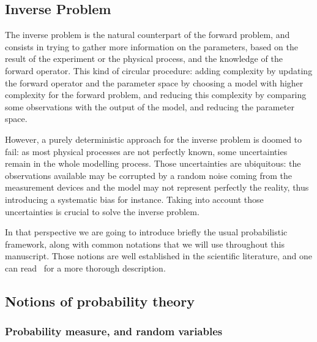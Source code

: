 \documentclass[a4paper,11pt]{article}
\theoremstyle{defi}
\numberwithin{thmCounter}{section}
\begin{document}
\subsection{Inverse Problem}
The inverse problem is the natural counterpart of the forward problem, and consists in trying to gather more information on the parameters, based on the result of the experiment or the physical process, and the knowledge of the forward operator. This kind of circular procedure: adding complexity by updating the forward operator and the parameter space by choosing a model with higher complexity for the forward problem, and reducing this complexity by comparing some observations with the output of the model, and reducing the parameter space.


However, a purely deterministic approach for the inverse problem is doomed to fail: as most physical processes are not perfectly known, some uncertainties remain in the whole modelling process. Those uncertainties are ubiquitous: the observations available may be corrupted by a random noise coming from the measurement devices and the model may not represent perfectly the reality, thus introducing a systematic bias for instance. Taking into account those uncertainties is crucial to solve the inverse problem.


In that perspective we are going to introduce briefly the usual probabilistic framework, along with common notations that we will use throughout this manuscript. Those notions are well established in the scientific literature, and one can read~\cite{billingsley_probability_2008} for a more thorough description.
\subsection{Notions of probability theory}
\subsubsection{Probability measure, and random variables}
\label{sec:notion_prob_theory}
\end{document}
